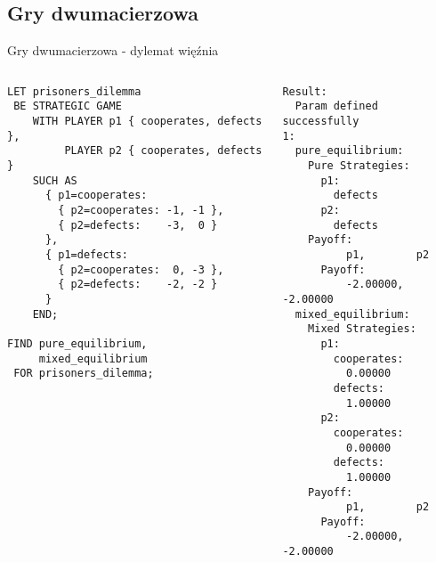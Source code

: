 \documentclass[xcolor=x11names,compress]{beamer}
\renewcommand{\(}{\begin{columns}}
\renewcommand{\)}{\end{columns}}
\newcommand{\<}[1]{\begin{column}{#1}}
\renewcommand{\>}{\end{column}}
\begin{document}
\subsection{Gry dwumacierzowa}
\begin{frame}[fragile]{Gry dwumacierzowa - dylemat więźnia}
\begin{columns}[c]
\begin{column}{.5\textwidth}
\begin{lstlisting}
LET prisoners_dilemma
 BE STRATEGIC GAME
    WITH PLAYER p1 { cooperates, defects },
         PLAYER p2 { cooperates, defects }
    SUCH AS
      { p1=cooperates:
        { p2=cooperates: -1, -1 },
        { p2=defects:    -3,  0 }
      },
      { p1=defects:
        { p2=cooperates:  0, -3 },
        { p2=defects:    -2, -2 }
      }
    END;

FIND pure_equilibrium,
     mixed_equilibrium
 FOR prisoners_dilemma;
\end{lstlisting}
\end{column}
\vrule
\begin{column}{.5\textwidth}
\begin{lstlisting}
Result:
  Param defined successfully
1:
  pure_equilibrium:
    Pure Strategies:
      p1:
        defects
      p2:
        defects
    Payoff:
          p1,        p2
      Payoff:
          -2.00000,  -2.00000
  mixed_equilibrium:
    Mixed Strategies:
      p1:
        cooperates:
          0.00000
        defects:
          1.00000
      p2:
        cooperates:
          0.00000
        defects:
          1.00000
    Payoff:
          p1,        p2
      Payoff:
          -2.00000,  -2.00000
\end{lstlisting}
\end{column}
\end{columns}
\end{frame}
\end{document}
